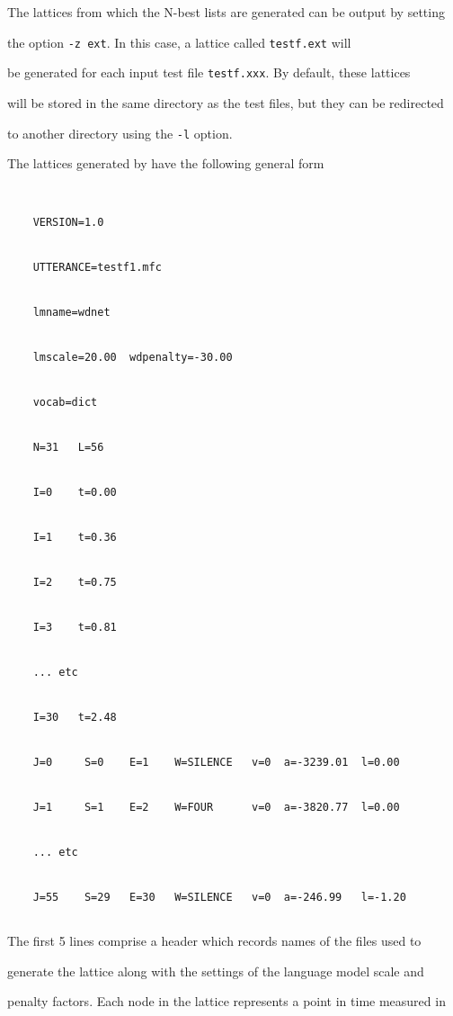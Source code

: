 The lattices from which the N-best lists are generated can be output by setting


the option \texttt{-z ext}.  In this case, a lattice called \texttt{testf.ext} will


be generated for each input test file \texttt{testf.xxx}.  By default, these lattices


will  be stored in the same directory as the test files, but they can be redirected


to another directory using the \texttt{-l} option.







The lattices generated by  have the following general form


\begin{verbatim}


    VERSION=1.0


    UTTERANCE=testf1.mfc


    lmname=wdnet


    lmscale=20.00  wdpenalty=-30.00


    vocab=dict


    N=31   L=56   


    I=0    t=0.00  


    I=1    t=0.36  


    I=2    t=0.75  


    I=3    t=0.81


    ... etc


    I=30   t=2.48  


    J=0     S=0    E=1    W=SILENCE   v=0  a=-3239.01  l=0.00    


    J=1     S=1    E=2    W=FOUR      v=0  a=-3820.77  l=0.00    


    ... etc


    J=55    S=29   E=30   W=SILENCE   v=0  a=-246.99   l=-1.20   


\end{verbatim}





The first 5 lines comprise a header which records names of the files used to


generate the lattice along with the settings of the language model scale and


penalty factors. Each node in the lattice represents a point in time measured in


